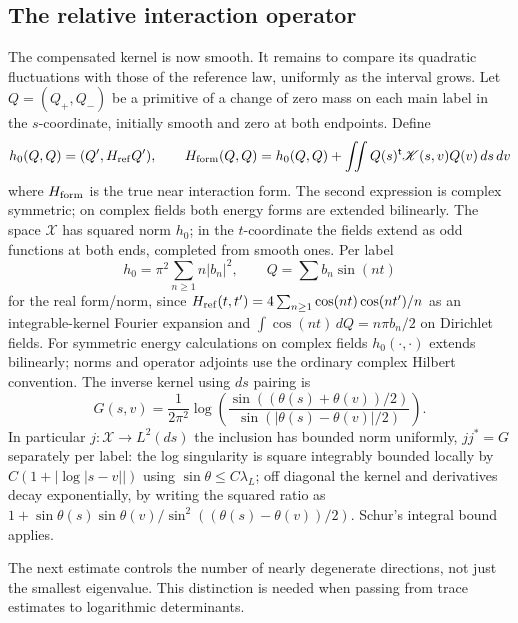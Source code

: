 \subsection{The relative interaction operator}

The compensated kernel is now smooth. It remains to compare its
quadratic fluctuations with those of the reference law, uniformly as
the interval grows. Let \(Q=(Q_+,Q_-)\) be a primitive of a change
of zero mass on each main label in the \(s\)-coordinate, initially
smooth and zero at both endpoints. Define
\[
 h_0(Q,Q)=(Q',H_{\rm ref}Q'),\qquad
 H_{\rm form}(Q,Q)=h_0(Q,Q)+
   \iint Q(s)^{\mathsf t}\mathscr K(s,v)Q(v)\,ds\,dv
\]
where \(H_{\rm form}\) is the true near interaction form. The second expression is complex symmetric; on complex fields both energy forms are extended bilinearly. The space \(\mathcal X\) has squared norm \(h_0\); in the \(t\)-coordinate the fields extend as odd functions at both ends, completed from smooth ones. Per label
\[
h_0=\pi^2\sum_{n\ge1} n |b_n|^2,\qquad Q=\sum b_n\sin(nt)
\]
for the real form/norm, since \(H_{\rm ref}(t,t')=4\sum_{n\ge1}\cos(nt)\cos(nt')/n\) as an integrable-kernel Fourier expansion and \(\int\cos(nt)\,dQ=n\pi b_n/2\) on Dirichlet fields. For symmetric energy calculations on complex fields \(h_0(\cdot,\cdot)\) extends bilinearly; norms and operator adjoints use the ordinary complex Hilbert convention. The inverse kernel using \(ds\) pairing is
\[
 G(s,v)=\frac{1}{2\pi^2}\log\left(\frac{\sin((\theta(s)+\theta(v))/2)}
                  {\sin(|\theta(s)-\theta(v)|/2)}\right).
\]
In particular \(j:\mathcal X\to L^2(ds)\) the inclusion has bounded norm uniformly, \(jj^*=G\) separately per label: the log singularity is square integrably bounded locally by \(C(1+|\log|s-v||)\) using \(\sin\theta\le C\lambda_L\); off diagonal the kernel and derivatives decay exponentially, by writing the squared ratio as \(1+\sin\theta(s)\sin\theta(v)/\sin^2((\theta(s)-\theta(v))/2)\). Schur's integral bound applies.

The next estimate controls the number of nearly degenerate directions,
not just the smallest eigenvalue. This distinction is needed when
passing from trace estimates to logarithmic determinants.

